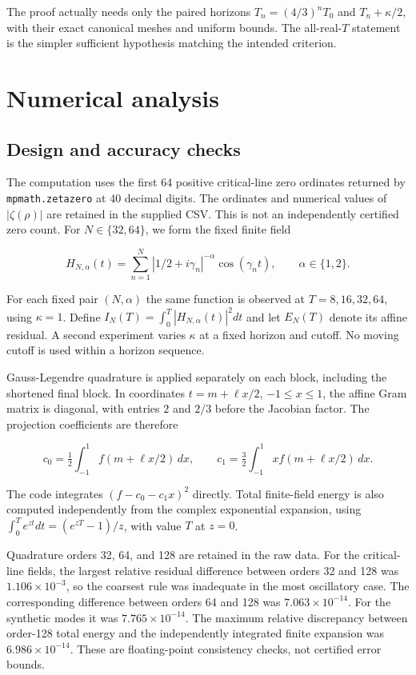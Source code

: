 \documentclass[
  11pt,
]{article}
\begin{document}
The proof actually needs only the paired horizons \(T_n=(4/3)^nT_0\) and
\(T_n+\kappa/2\), with their exact canonical meshes and uniform bounds.
The all-real-\(T\) statement is the simpler sufficient hypothesis
matching the intended criterion.

\hypertarget{numerical-analysis}{%
\section{Numerical analysis}\label{numerical-analysis}}

\hypertarget{design-and-accuracy-checks}{%
\subsection{Design and accuracy
checks}\label{design-and-accuracy-checks}}

The computation uses the first 64 positive critical-line zero ordinates
returned by \texttt{mpmath.zetazero} at 40 decimal digits. The ordinates
and numerical values of \(|\zeta(\rho)|\) are retained in the supplied
CSV. This is not an independently certified zero count. For
\(N\in\{32,64\}\), we form the fixed finite field

\[
H_{N,\alpha}(t)=\sum_{n=1}^{N}|1/2+i\gamma_n|^{-\alpha}\cos(\gamma_nt),
\qquad \alpha\in\{1,2\}.
\]

For each fixed pair \((N,\alpha)\) the same function is observed at
\(T=8,16,32,64\), using \(\kappa=1\). Define
\(I_N(T)=\int_0^T|H_{N,\alpha}(t)|^2dt\) and let \(E_N(T)\) denote its
affine residual. A second experiment varies \(\kappa\) at a fixed
horizon and cutoff. No moving cutoff is used within a horizon sequence.

Gauss-Legendre quadrature is applied separately on each block, including
the shortened final block. In coordinates \(t=m+\ell x/2\),
\(-1\le x\le1\), the affine Gram matrix is diagonal, with entries \(2\)
and \(2/3\) before the Jacobian factor. The projection coefficients are
therefore

\[
c_0=\tfrac12\int_{-1}^1 f(m+\ell x/2)\,dx,
\qquad c_1=\tfrac32\int_{-1}^1 x f(m+\ell x/2)\,dx.
\]

The code integrates \((f-c_0-c_1x)^2\) directly. Total finite-field
energy is also computed independently from the complex exponential
expansion, using \(\int_0^T e^{zt}dt=(e^{zT}-1)/z\), with value \(T\) at
\(z=0\).

Quadrature orders 32, 64, and 128 are retained in the raw data. For the
critical-line fields, the largest relative residual difference between
orders 32 and 128 was \(1.106\times10^{-3}\), so the coarsest rule was
inadequate in the most oscillatory case. The corresponding difference
between orders 64 and 128 was \(7.063\times10^{-14}\). For the synthetic
modes it was \(7.765\times10^{-14}\). The maximum relative discrepancy
between order-128 total energy and the independently integrated finite
expansion was \(6.986\times10^{-14}\). These are floating-point
consistency checks, not certified error bounds.
\end{document}

